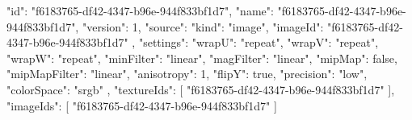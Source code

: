 {
  "id": "f6183765-df42-4347-b96e-944f833bf1d7",
  "name": "f6183765-df42-4347-b96e-944f833bf1d7",
  "version": 1,
  "source": {
    "kind": "image",
    "imageId": "f6183765-df42-4347-b96e-944f833bf1d7"
  },
  "settings": {
    "wrapU": "repeat",
    "wrapV": "repeat",
    "wrapW": "repeat",
    "minFilter": "linear",
    "magFilter": "linear",
    "mipMap": false,
    "mipMapFilter": "linear",
    "anisotropy": 1,
    "flipY": true,
    "precision": "low",
    "colorSpace": "srgb"
  },
  "textureIds": [
    "f6183765-df42-4347-b96e-944f833bf1d7"
  ],
  "imageIds": [
    "f6183765-df42-4347-b96e-944f833bf1d7"
  ]
}
